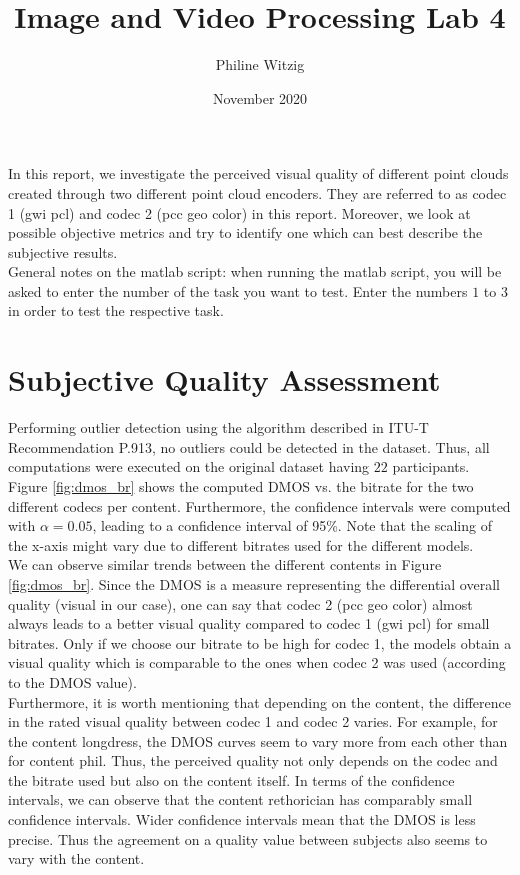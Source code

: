 \documentclass{article}
\title{Image and Video Processing Lab 4}
\author{Philine Witzig}
\date{November 2020}
\begin{document}
\maketitle
In this report, we investigate the perceived visual quality of different point clouds created through two different point cloud encoders. They are referred to as codec 1 (gwi pcl) and codec 2 (pcc geo color) in this report. Moreover, we look at possible objective metrics and try to identify one which can best describe the subjective results. \\

General notes on the matlab script: when running the matlab script, you will be asked to enter the number of the task you want to test. Enter the numbers $1$ to $3$ in order to test the respective task. 


\section{Subjective Quality Assessment}
Performing outlier detection using the algorithm described in ITU-T Recommendation P.913, no outliers could be detected in the dataset. Thus, all computations were executed on the original dataset having $22$ participants. \\

Figure \ref{fig:dmos_br} shows the computed DMOS vs. the bitrate for the two different codecs per content. Furthermore, the confidence intervals were computed with $\alpha=0.05$, leading to a confidence interval of 95\%. Note that the scaling of the x-axis might vary due to different bitrates used for the different models. \\

We can observe similar trends between the different contents in Figure \ref{fig:dmos_br}. Since the DMOS is a measure representing the differential overall quality (visual in our case), one can say that codec 2 (pcc geo color) almost always leads to a better visual quality compared to codec 1 (gwi pcl) for small bitrates. Only if we choose our bitrate to be high for codec 1, the models obtain a visual quality which is comparable to the ones when codec 2 was used (according to the DMOS value). \\

Furthermore, it is worth mentioning that depending on the content, the difference in the rated visual quality between codec 1 and codec 2 varies. For example, for the content \textsf{longdress}, the DMOS curves seem to vary more from each other than for content \textsf{phil}. Thus, the perceived quality not only depends on the codec and the bitrate used but also on the content itself. In terms of the confidence intervals, we can observe that the content \textsf{rethorician} has comparably small confidence intervals. Wider confidence intervals mean that the DMOS is less precise. Thus the agreement on a quality value between subjects also seems to vary with the content. \\
\end{document}
